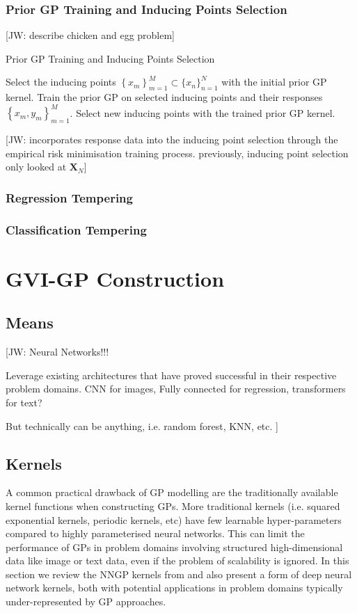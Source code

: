 \documentclass{article}
\newcommand{\jw}[1]{{\color{gray} [JW: #1]}}
\numberwithin{equation}{section}
\begin{document}
\subsubsection{Prior GP Training and Inducing Points Selection}
\jw{describe chicken and egg problem}

\begin{algorithm}
\caption{Prior GP Training and Inducing Points Selection}\label{alg:gvi-gp}
\begin{algorithmic}
 \State Select the inducing points $\left\{x_m\right\}_{m=1}^{M} \subset \{x_n\}_{n=1}^{N}$ with the initial prior GP kernel.
\State Train the prior GP on selected inducing points and their responses $\left\{x_m, y_m\right\}_{m=1}^{M}$.
\State  Select new inducing points with the trained prior GP kernel.
\EndWhile
\end{algorithmic}
\end{algorithm}
\jw{incorporates response data into the inducing point selection through the empirical risk minimisation training process. previously, inducing point selection only looked at $\mathbf{X}_N$}

\subsubsection{Regression Tempering}
\subsubsection{Classification Tempering}

\newpage
\section{GVI-GP Construction}\label{section:gvi-gp-construction}
\subsection{Means}
\jw{
Neural Networks!!!

Leverage existing architectures that have proved successful in their respective problem domains. CNN for images, Fully connected for regression, transformers for text?

But technically can be anything, i.e. random forest, KNN, etc.
}

\subsection{Kernels}\label{section:kernels}
A common practical drawback of GP modelling are the traditionally available kernel functions when constructing GPs. More traditional kernels (i.e. squared exponential kernels, periodic kernels, etc) have few learnable hyper-parameters compared to highly parameterised neural networks. This can limit the performance of GPs in problem domains involving structured high-dimensional data like image or text data, even if the problem of scalability is ignored. In this section we review the NNGP kernels from \cite{novak2019neural} and also present a form of deep neural network kernels, both with potential applications in problem domains typically under-represented by GP approaches.
\end{document}
